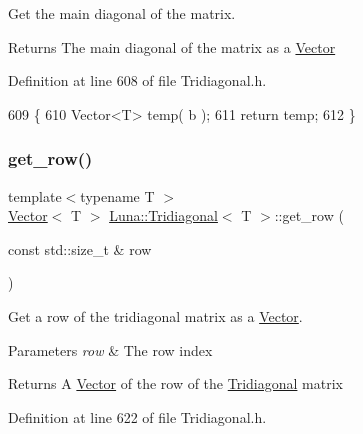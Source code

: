 Get the main diagonal of the matrix. 

\begin{DoxyReturn}{Returns}
The main diagonal of the matrix as a \hyperlink{classLuna_1_1Vector}{Vector} 
\end{DoxyReturn}


Definition at line 608 of file Tridiagonal.\+h.


\begin{DoxyCode}
609   \{
610     Vector<T> temp( b );
611     \textcolor{keywordflow}{return} temp;
612   \}
\end{DoxyCode}
\mbox{\label{classLuna_1_1Tridiagonal_a4199f825838490b1a708dfa953963ce5}} 
\subsubsection{\texorpdfstring{get\+\_\+row()}{get\_row()}}
{\footnotesize\ttfamily template$<$typename T $>$ \\
\hyperlink{classLuna_1_1Vector}{Vector}$<$ T $>$ \hyperlink{classLuna_1_1Tridiagonal}{Luna\+::\+Tridiagonal}$<$ T $>$\+::get\+\_\+row (\begin{DoxyParamCaption}\item[{const std\+::size\+\_\+t \&}]{row }\end{DoxyParamCaption})\hspace{0.3cm}{\ttfamily [inline]}}



Get a row of the tridiagonal matrix as a \hyperlink{classLuna_1_1Vector}{Vector}. 


\begin{DoxyParams}{Parameters}
{\em row} & The row index \\
\hline
\end{DoxyParams}
\begin{DoxyReturn}{Returns}
A \hyperlink{classLuna_1_1Vector}{Vector} of the row of the \hyperlink{classLuna_1_1Tridiagonal}{Tridiagonal} matrix 
\end{DoxyReturn}


Definition at line 622 of file Tridiagonal.\+h.



